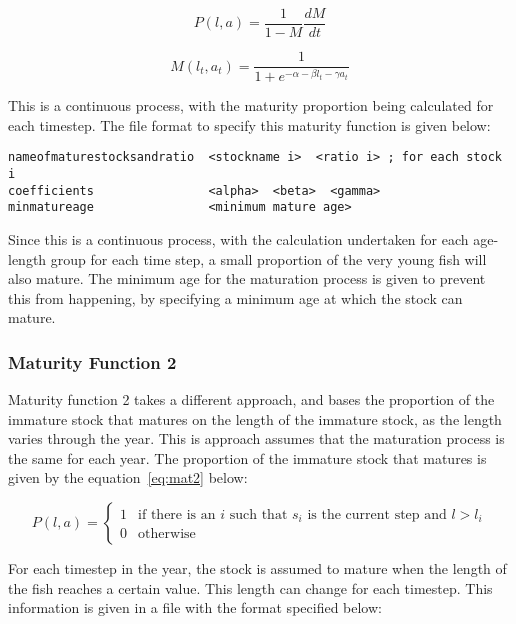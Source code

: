 \documentclass [a4paper, 10pt]{book}
\begin{document}
\begin{equation}\label{eq:mat1a}
P(l, a) = {\frac{1}{1 - M}}{\frac{dM}{dt}}
\end{equation}

\begin{equation}\label{eq:mat1b}
M(l_{t},a_{t}) = \frac{1}{ 1 + e^{-\alpha - \beta l_{t} - \gamma a_{t}}}
\end{equation}

\bigskip
This is a continuous process, with the maturity proportion being calculated for each timestep.  The file format to specify this maturity function is given below:

\begin{verbatim}
nameofmaturestocksandratio  <stockname i>  <ratio i> ; for each stock i
coefficients                <alpha>  <beta>  <gamma>
minmatureage                <minimum mature age>
\end{verbatim}

Since this is a continuous process, with the calculation undertaken for each age-length group for each time step, a small proportion of the very young fish will also mature.  The minimum age for the maturation process is given to prevent this from happening, by specifying a minimum age at which the stock can mature.

\subsubsection{Maturity Function 2}
Maturity function 2 takes a different approach, and bases the proportion of the immature stock that matures on the length of the immature stock, as the length varies through the year.  This is approach assumes that the maturation process is the same for each year.  The proportion of the immature stock that matures is given by the equation~\ref{eq:mat2} below:

\begin{equation}\label{eq:mat2}
P(l, a) = 
\begin{cases} 
1 & \textrm{if there is an $i$ such that $s_i$ is the current step and $l > l_i$}\\
0 & \textrm{otherwise}
\end{cases}
\end{equation}

\bigskip
For each timestep in the year, the stock is assumed to mature when the length of the fish reaches a certain value.  This length can change for each timestep.  This information is given in a file with the format specified below:
\end{document}
